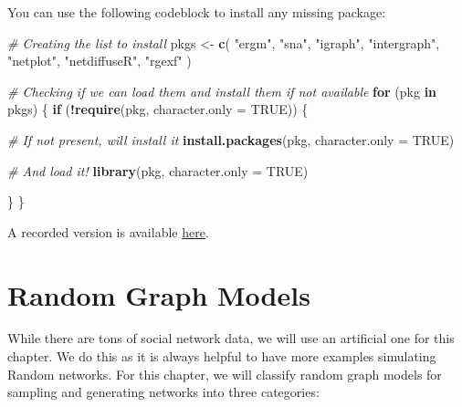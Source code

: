\documentclass[]{book}
\newenvironment{Shaded}{\begin{snugshade}}{\end{snugshade}}
\newcommand{\CommentTok}[1]{\textcolor[rgb]{0.56,0.35,0.01}{\textit{#1}}}
\newcommand{\ControlFlowTok}[1]{\textcolor[rgb]{0.13,0.29,0.53}{\textbf{#1}}}
\newcommand{\DataTypeTok}[1]{\textcolor[rgb]{0.13,0.29,0.53}{#1}}
\newcommand{\KeywordTok}[1]{\textcolor[rgb]{0.13,0.29,0.53}{\textbf{#1}}}
\newcommand{\NormalTok}[1]{#1}
\newcommand{\OperatorTok}[1]{\textcolor[rgb]{0.81,0.36,0.00}{\textbf{#1}}}
\newcommand{\OtherTok}[1]{\textcolor[rgb]{0.56,0.35,0.01}{#1}}
\newcommand{\StringTok}[1]{\textcolor[rgb]{0.31,0.60,0.02}{#1}}
\begin{document}
You can use the following codeblock to install any missing package:

\begin{Shaded}
\begin{Highlighting}[]
\CommentTok{# Creating the list to install}
\NormalTok{pkgs <-}\StringTok{ }\KeywordTok{c}\NormalTok{(}
  \StringTok{"ergm"}\NormalTok{, }\StringTok{"sna"}\NormalTok{, }\StringTok{"igraph"}\NormalTok{, }\StringTok{"intergraph"}\NormalTok{, }\StringTok{"netplot"}\NormalTok{, }\StringTok{"netdiffuseR"}\NormalTok{, }\StringTok{"rgexf"}
\NormalTok{  )}

\CommentTok{# Checking if we can load them and install them if not available}
\ControlFlowTok{for}\NormalTok{ (pkg }\ControlFlowTok{in}\NormalTok{ pkgs) \{}
  \ControlFlowTok{if}\NormalTok{ (}\OperatorTok{!}\KeywordTok{require}\NormalTok{(pkg, }\DataTypeTok{character.only =} \OtherTok{TRUE}\NormalTok{)) \{}

    \CommentTok{# If not present, will install it}
    \KeywordTok{install.packages}\NormalTok{(pkg, }\DataTypeTok{character.only =} \OtherTok{TRUE}\NormalTok{)}

    \CommentTok{# And load it!}
    \KeywordTok{library}\NormalTok{(pkg, }\DataTypeTok{character.only =} \OtherTok{TRUE}\NormalTok{)}

\NormalTok{  \}}
\NormalTok{\}}
\end{Highlighting}
\end{Shaded}

A recorded version is available \href{https://youtu.be/VasQf--gT-E}{here}.

\hypertarget{random-graph-models}{%
\section{Random Graph Models}\label{random-graph-models}}

While there are tons of social network data, we will use an artificial one for this chapter.
We do this as it is always helpful to have more examples simulating Random
networks. For this chapter, we will classify random graph models for sampling and
generating networks into three categories:
\end{document}
